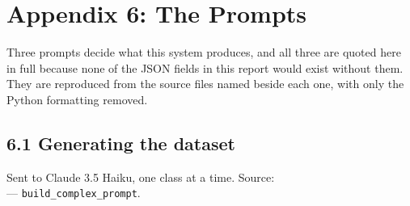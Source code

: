 \section*{Appendix 6: The Prompts}

Three prompts decide what this system produces, and all three are quoted here in
full because none of the JSON fields in this report would exist without them. They
are reproduced from the source files named beside each one, with only the Python
formatting removed.

\newcommand{\promptblock}[1]{%
  \smallskip
  \begingroup\footnotesize\ttfamily\raggedright\setlength{\parindent}{0pt}%
  \setlength{\parskip}{0pt}%
  #1\par\endgroup\medskip}

\subsection*{6.1 Generating the dataset}

Sent to Claude 3.5 Haiku, one class at a time. Source:\\
 --- \texttt{build\_complex\_prompt}.

